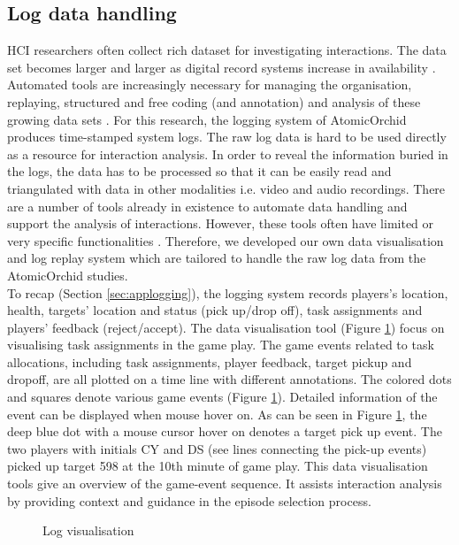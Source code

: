 \subsection{Log data handling} \label{sec:aprloghandling}
\acf{HCI} researchers often collect rich dataset for investigating interactions. The data set becomes larger and larger as digital record systems increase in availability \citep{Brundell}. Automated tools are increasingly necessary for managing the organisation, replaying, structured and free coding (and annotation) and analysis of these growing data sets \citep{Brundell}. For this research, the logging system of AtomicOrchid produces time-stamped system logs. The raw log data is hard to be used directly as a resource for interaction analysis. In order to reveal the information buried in the logs, the data has to be processed so that it can be easily read and triangulated with data in other modalities i.e.  video and audio recordings. There are a number of tools already in existence to automate data handling and support the analysis of interactions. However, these tools often have limited or very specific functionalities \citep{Brundell}. Therefore, we developed our own data visualisation and log replay system which are tailored to handle the raw log data from the AtomicOrchid studies.\\

To recap (Section \ref{sec:applogging}), the logging system records players's location, health, targets' location and status (pick up/drop off), task assignments and players' feedback (reject/accept). The data visualisation tool (Figure \ref{fig:logvis}) focus on visualising task assignments in the game play. The game events related to task allocations, including task assignments, player feedback, target pickup and dropoff, are all plotted on a time line with different annotations. The colored dots and squares denote various game events (Figure \ref{fig:logvis}). Detailed information of the event can be displayed when mouse hover on. As can be seen in Figure \ref{fig:logvis}, the deep blue dot with a mouse cursor hover on denotes a target pick up event. The two players with initials CY and DS (see lines connecting the pick-up events) picked up target 598 at the 10th minute of game play. This data visualisation tools give an overview of the game-event sequence. It assists interaction analysis by providing context and guidance in the episode selection process. \\

\begin{figure}[h]
  \centering
  \caption{Log visualisation}
  \label{fig:logvis}
\end{figure}

